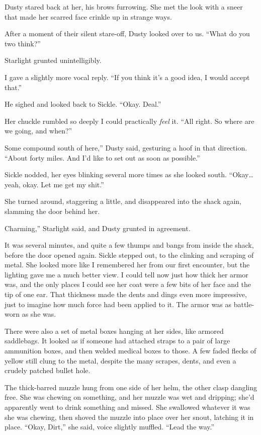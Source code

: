 Dusty stared back at her, his brows furrowing. She met the look with a sneer that made her scarred face crinkle up in strange ways.

After a moment of their silent stare-off, Dusty looked over to us. “What do you two think?”

Starlight grunted unintelligibly.

I gave a slightly more vocal reply. “If you think it’s a good idea, I would accept that.”

He sighed and looked back to Sickle. “Okay. Deal.”

Her chuckle rumbled so deeply I could practically \textit{feel} it. “All right. So where are we going, and when?”

\leavevmode{}Some compound south of here,” Dusty said, gesturing a hoof in that direction. “About forty miles. And I’d like to set out as soon as possible.”

Sickle nodded, her eyes blinking several more times as she looked south. “Okay… yeah, okay. Let me get my shit.”

She turned around, staggering a little, and disappeared into the shack again, slamming the door behind her.

\leavevmode{}Charming,” Starlight said, and Dusty grunted in agreement.

It was several minutes, and quite a few thumps and bangs from inside the shack, before the door opened again. Sickle stepped out, to the clinking and scraping of metal. She looked more like I remembered her from our first encounter, but the lighting gave me a much better view. I could tell now just how thick her armor was, and the only places I could see her coat were a few bits of her face and the tip of one ear. That thickness made the dents and dings even more impressive, just to imagine how much force had been applied to it. The armor was as battle-worn as she was.

There were also a set of metal boxes hanging at her sides, like armored saddlebags. It looked as if someone had attached straps to a pair of large ammunition boxes, and then welded medical boxes to those. A few faded flecks of yellow still clung to the metal, despite the many scrapes, dents, and even a crudely patched bullet hole.

The thick-barred muzzle hung from one side of her helm, the other clasp dangling free. She was chewing on something, and her muzzle was wet and dripping; she’d apparently went to drink something and missed. She swallowed whatever it was she was chewing, then shoved the muzzle into place over her snout, latching it in place. “Okay, Dirt,” she said, voice slightly muffled. “Lead the way.”

